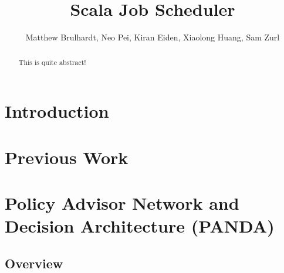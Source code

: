 \documentclass{article}
\title{Scala Job Scheduler}
\author{Matthew Brulhardt, Neo Pei, Kiran Eiden, Xiaolong Huang, Sam Zurl}
\begin{document}
	\maketitle

	\begin{abstract}
		This is quite abstract!
	\end{abstract}

	\section{Introduction}

	\section{Previous Work}


	\section{Policy Advisor Network and Decision Architecture (PANDA)}


	    \subsection{Overview}


\end{document}
